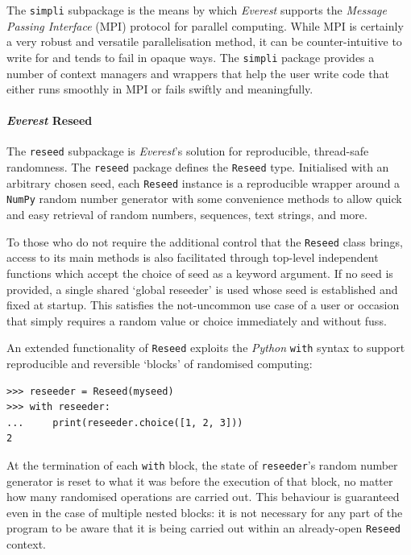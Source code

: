 \documentclass[a4paper,11pt,oneside]{book}
\begin{document}
The \texttt{simpli} subpackage is the means by which \textit{Everest} supports the \textit{Message Passing Interface} (MPI) protocol for parallel computing. While MPI is certainly a very robust and versatile parallelisation method, it can be counter-intuitive to write for and tends to fail in opaque ways. The \texttt{simpli} package provides a number of context managers and wrappers that help the user write code that either runs smoothly in MPI or fails swiftly and meaningfully.

\paragraph{\textit{Everest} Reseed}

The \texttt{reseed} subpackage is \textit{Everest}'s solution for reproducible, thread-safe randomness. The \texttt{reseed} package defines the \texttt{Reseed} type. Initialised with an arbitrary chosen seed, each \texttt{Reseed} instance is a reproducible wrapper around a \texttt{NumPy} random number generator with some convenience methods to allow quick and easy retrieval of random numbers, sequences, text strings, and more.

To those who do not require the additional control that the \texttt{Reseed} class brings, access to its main methods is also facilitated through top-level independent functions which accept the choice of seed as a keyword argument. If no seed is provided, a single shared `global reseeder' is used whose seed is established and fixed at startup. This satisfies the not-uncommon use case of a user or occasion that simply requires a random value or choice immediately and without fuss.

An extended functionality of \texttt{Reseed} exploits the \textit{Python} \texttt{with} syntax to support reproducible and reversible `blocks' of randomised computing:

\begin{verbatim}
>>> reseeder = Reseed(myseed)
>>> with reseeder:
...     print(reseeder.choice([1, 2, 3]))
2
\end{verbatim}

At the termination of each \texttt{with} block, the state of \texttt{reseeder}'s random number generator is reset to what it was before the execution of that block, no matter how many randomised operations are carried out. This behaviour is guaranteed even in the case of multiple nested blocks: it is not necessary for any part of the program to be aware that it is being carried out within an already-open \texttt{Reseed} context.
\end{document}

